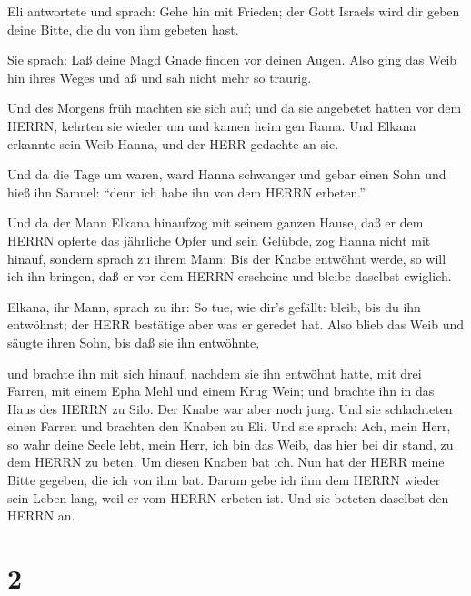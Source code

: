  Eli antwortete und sprach: Gehe hin mit Frieden; der Gott
Israels wird dir geben deine Bitte, die du von ihm gebeten hast.

 Sie sprach: Laß deine Magd Gnade finden vor deinen Augen.
Also ging das Weib hin ihres Weges und aß und sah nicht mehr so traurig.

 Und des Morgens früh machten sie sich auf; und da sie
angebetet hatten vor dem HERRN, kehrten sie wieder um und kamen heim gen
Rama. Und Elkana erkannte sein Weib Hanna, und der HERR gedachte an sie.

 Und da die Tage um waren, ward Hanna schwanger und gebar
einen Sohn und hieß ihn Samuel: ``denn ich habe ihn von dem HERRN
erbeten.''

 Und da der Mann Elkana hinaufzog mit seinem ganzen Hause,
daß er dem HERRN opferte das jährliche Opfer und sein Gelübde,
 zog Hanna nicht mit hinauf, sondern sprach zu ihrem Mann:
Bis der Knabe entwöhnt werde, so will ich ihn bringen, daß er vor dem
HERRN erscheine und bleibe daselbst ewiglich.

 Elkana, ihr Mann, sprach zu ihr: So tue, wie dir's
gefällt: bleib, bis du ihn entwöhnst; der HERR bestätige aber was er
geredet hat. Also blieb das Weib und säugte ihren Sohn, bis daß sie ihn
entwöhnte,

 und brachte ihn mit sich hinauf, nachdem sie ihn entwöhnt
hatte, mit drei Farren, mit einem Epha Mehl und einem Krug Wein; und
brachte ihn in das Haus des HERRN zu Silo. Der Knabe war aber noch jung.
 Und sie schlachteten einen Farren und brachten den Knaben
zu Eli.  Und sie sprach: Ach, mein Herr, so wahr deine
Seele lebt, mein Herr, ich bin das Weib, das hier bei dir stand, zu dem
HERRN zu beten.  Um diesen Knaben bat ich. Nun hat der HERR
meine Bitte gegeben, die ich von ihm bat.  Darum gebe ich
ihm dem HERRN wieder sein Leben lang, weil er vom HERRN erbeten ist. Und
sie beteten daselbst den HERRN an.

\hypertarget{section-1}{%
\section{2}\label{section-1}}

